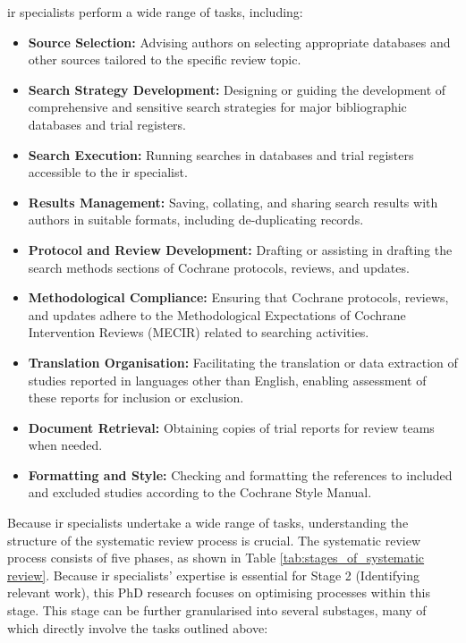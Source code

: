 \documentclass{article}
\begin{document}
\gls*{ir} specialists perform a wide range of tasks, including:

\begin{itemize}
\item {\bf{Source Selection:}} Advising authors on selecting appropriate databases and other sources tailored to the specific review topic.
\item {\bf{Search Strategy Development:}} Designing or guiding the development of comprehensive and sensitive search strategies for major bibliographic databases and trial registers.
\item {\bf{Search Execution:}} Running searches in databases and trial registers accessible to the \gls*{ir} specialist.
\item {\bf{Results Management:}} Saving, collating, and sharing search results with authors in suitable formats, including de-duplicating records.
\item {\bf{Protocol and Review Development:}} Drafting or assisting in drafting the search methods sections of Cochrane protocols, reviews, and updates.
\item {\bf{Methodological Compliance:}} Ensuring that Cochrane protocols, reviews, and updates adhere to the Methodological Expectations of Cochrane Intervention Reviews (MECIR) related to searching activities.
\item {\bf{Translation Organisation:}} Facilitating the translation or data extraction of studies reported in languages other than English, enabling assessment of these reports for inclusion or exclusion.
\item {\bf{Document Retrieval:}} Obtaining copies of trial reports for review teams when needed.
\item {\bf{Formatting and Style:}} Checking and formatting the references to included and excluded studies according to the Cochrane Style Manual.
\end{itemize}

Because \gls*{ir} specialists undertake a wide range of tasks, understanding the structure of the systematic review process is crucial. The systematic review process consists of five phases, as shown in Table \ref{tab:stages_of_systematic review}. Because \gls*{ir} specialists' expertise is essential for Stage 2 (Identifying relevant work), this PhD research focuses on optimising processes within this stage. This stage can be further granularised into several substages, many of which directly involve the tasks outlined above:
\end{document}
